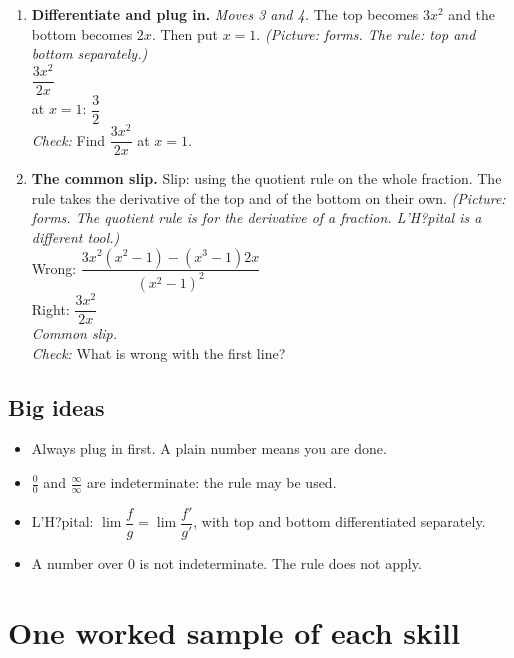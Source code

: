 \documentclass[11pt]{article}
\begin{document}
\begin{enumerate}
\item \textbf{Differentiate and plug in.} \textit{Moves 3 and 4.} The top becomes $3x^2$ and the bottom becomes $2x$. Then put $x=1$. \textit{(Picture: forms. The rule: top and bottom separately.)}\\ $\dfrac{3x^2}{2x}$\\ at $x=1$: $\dfrac32$\\ \textit{Check:} Find $\dfrac{3x^2}{2x}$ at $x=1$. 
\item \textbf{The common slip.} Slip: using the quotient rule on the whole fraction. The rule takes the derivative of the top and of the bottom on their own. \textit{(Picture: forms. The quotient rule is for the derivative of a fraction. L'H?pital is a different tool.)}\\ Wrong: $\dfrac{3x^2(x^2-1)-(x^3-1)2x}{(x^2-1)^2}$\\ Right: $\dfrac{3x^2}{2x}$\\ \textit{Common slip.}\\ \textit{Check:} What is wrong with the first line? 
\end{enumerate}
\subsection*{Big ideas}\begin{itemize}\item Always plug in first. A plain number means you are done.
\item $\frac00$ and $\frac{\infty}{\infty}$ are indeterminate: the rule may be used.
\item L'H?pital: $\lim\dfrac fg=\lim\dfrac{f'}{g'}$, with top and bottom differentiated separately.
\item A number over 0 is not indeterminate. The rule does not apply.\end{itemize}
\section*{One worked sample of each skill}
\end{document}
